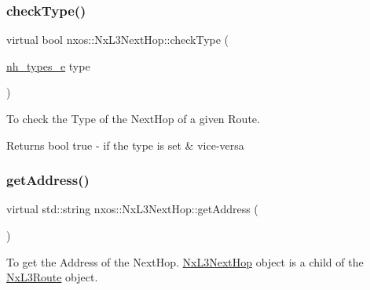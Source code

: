 \subsubsection{\texorpdfstring{check\+Type()}{checkType()}}
{\footnotesize\ttfamily virtual bool nxos\+::\+Nx\+L3\+Next\+Hop\+::check\+Type (\begin{DoxyParamCaption}\item[{\mbox{\hyperlink{classnxos_1_1_nx_l3_next_hop_ab58475e35a53b76cb9bdbfde04d537f3}{nh\+\_\+types\+\_\+e}}}]{type }\end{DoxyParamCaption})\hspace{0.3cm}{\ttfamily [pure virtual]}}

To check the Type of the Next\+Hop of a given Route.

\begin{DoxyReturn}{Returns}
bool true -\/ if the type is set \& vice-\/versa
\end{DoxyReturn}

 \mbox{\label{classnxos_1_1_nx_l3_next_hop_a3a14a096cdf818a156c1be62623e644c}} 
\subsubsection{\texorpdfstring{get\+Address()}{getAddress()}}
{\footnotesize\ttfamily virtual std\+::string nxos\+::\+Nx\+L3\+Next\+Hop\+::get\+Address (\begin{DoxyParamCaption}{ }\end{DoxyParamCaption})\hspace{0.3cm}{\ttfamily [pure virtual]}}

To get the Address of the Next\+Hop. \mbox{\hyperlink{classnxos_1_1_nx_l3_next_hop}{Nx\+L3\+Next\+Hop}} object is a child of the \mbox{\hyperlink{classnxos_1_1_nx_l3_route}{Nx\+L3\+Route}} object.

